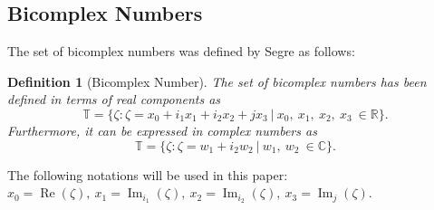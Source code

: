 \documentclass[a4paper,12pt]{article}
\newtheorem{definition}[theorem]{Definition}
\theoremstyle{remark}
\begin{document}
	
	
\subsection{Bicomplex Numbers}
The set of bicomplex numbers was defined by Segre \cite{csegre1892} as follows:
\begin{definition}[Bicomplex Number]
The set of bicomplex numbers has been defined in terms of real components as
\begin{equation}
\mathbb{T} =\{\zeta: \zeta = x_0 +i_1 x_1 +i_2 x_2 + j x_3~| ~x_0,~x_1,~x_2,~x_3~ \in \mathbb{R} \}. 	
\end{equation}
Furthermore, it can be expressed in complex numbers as
\begin{equation}\label{eq:bc}
\mathbb{T} = \{\zeta: \zeta =w_1 + i_2w_2~ |~w_1,~w_2 ~\in \mathbb{C}\}.	
\end{equation} 
\end{definition}
\noindent The following notations will be used in this paper:
$x_0=\operatorname{Re}(\zeta),~x_1=\operatorname{Im}_{i_1}(\zeta),~x_2=\operatorname{Im}_{i_2}(\zeta),~x_3=\operatorname{Im}_{j}(\zeta).$ 
	
\end{document}
